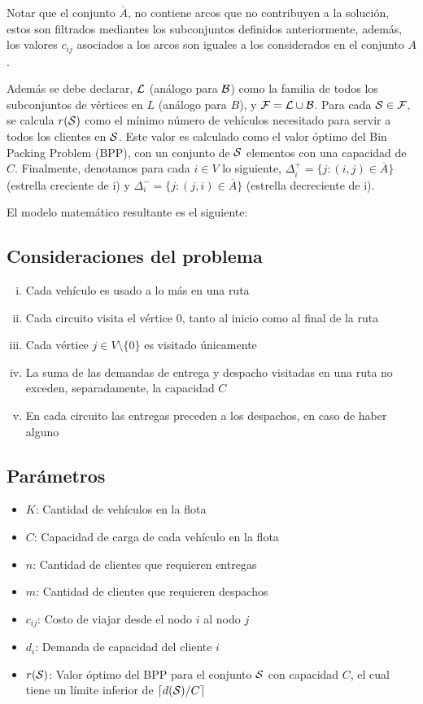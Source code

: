 \documentclass[letter, 10pt]{article}
\begin{document}
Notar que el conjunto $\overline{A}$, no contiene arcos que no contribuyen a la solución, estos son filtrados mediantes los subconjuntos definidos anteriormente, además, los valores $c_{ij}$ asociados a los arcos son iguales a los considerados en el conjunto $A$.

Además se debe declarar, $\CMcal{L}$ (análogo para $\CMcal{B}$) como la familia de todos los subconjuntos de vértices en $L$ (análogo para $B$), y $\CMcal{F} = \CMcal{L} \cup \CMcal{B}$. Para cada $\CMcal{S} \in \CMcal{F}$, se calcula $r(\CMcal{S})$ como el mínimo número de vehículos necesitado para servir a todos los clientes en $\CMcal{S}$. Este valor es calculado como el valor óptimo del Bin Packing Problem (BPP), con un conjunto de $\CMcal{S}$ elementos con una capacidad de $C$. Finalmente, denotamos para cada $i \in V$ lo siguiente, $\Delta_i^+ = \{j : (i, j) \in \overline{A}\}$ (estrella creciente de i) y $\Delta_i^- = \{j : (j, i) \in \overline{A}\}$ (estrella decreciente de i).

El modelo matemático resultante es el siguiente:

\subsection*{Consideraciones del problema}
\begin{enumerate}[(i)]
  \item Cada vehículo es usado a lo más en una ruta
  \item Cada circuito visita el vértice $0$, tanto al inicio como al final de la ruta
  \item Cada vértice $j \in V \setminus \{0\}$ es visitado únicamente
  \item La suma de las demandas de entrega y despacho visitadas en una ruta no exceden, separadamente, la capacidad $C$
  \item En cada circuito las entregas preceden a los despachos, en caso de haber alguno
\end{enumerate}

\subsection*{Parámetros}
\begin{itemize}
    \item $K$: Cantidad de vehículos en la flota
    \item $C$: Capacidad de carga de cada vehículo en la flota
    \item $n$: Cantidad de clientes que requieren entregas
    \item $m$: Cantidad de clientes que requieren despachos
    \item $c_{ij}$: Costo de viajar desde el nodo $i$ al nodo $j$
    \item $d_i$: Demanda de capacidad del cliente $i$
    \item $r(\CMcal{S})$: Valor óptimo del BPP para el conjunto $\CMcal{S}$ con capacidad $C$, el cual tiene un límite inferior de $\lceil d(\CMcal{S})/C \rceil$
\end{itemize}
\end{document}
